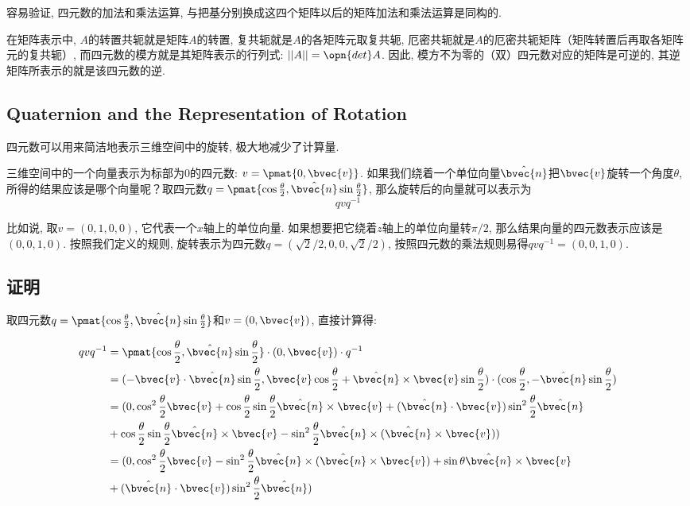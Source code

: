 容易验证, 四元数的加法和乘法运算, 与把基分别换成这四个矩阵以后的矩阵加法和乘法运算是同构的. 

在矩阵表示中, $A$的转置共轭就是矩阵$A$的转置, 复共轭就是$A$的各矩阵元取复共轭, 厄密共轭就是$A$的厄密共轭矩阵（矩阵转置后再取各矩阵元的复共轭）, 而四元数的模方就是其矩阵表示的行列式: $||A||=\opn{det}A$. 因此, 模方不为零的（双）四元数对应的矩阵是可逆的, 其逆矩阵所表示的就是该四元数的逆. 



\subsection{Quaternion and the Representation of Rotation}

四元数可以用来简洁地表示三维空间中的旋转, 极大地减少了计算量. 

三维空间中的一个向量表示为标部为$0$的四元数: $v=\pmat{0, \bvec{v}}$. 如果我们绕着一个单位向量$\hat{\bvec{n}}$把$\bvec{v}$旋转一个角度$\theta$, 所得的结果应该是哪个向量呢？取四元数$q=\pmat{\cos{\frac{\theta}{2}}, \hat{\bvec{n}}\sin{\frac{\theta}{2}}}$, 那么旋转后的向量就可以表示为
\begin{equation}
qvq^{-1}
\end{equation}

比如说, 取$v=(0, 1, 0, 0)$, 它代表一个$x$轴上的单位向量. 如果想要把它绕着$z$轴上的单位向量转$\pi/2$, 那么结果向量的四元数表示应该是$(0, 0, 1, 0)$. 按照我们定义的规则, 旋转表示为四元数$q=(\sqrt{2}/2, 0, 0, \sqrt{2}/2)$, 按照四元数的乘法规则易得$qvq^{-1}=(0,0,1,0)$. 

\subsection{证明}

取四元数$q=\pmat{\cos{\frac{\theta}{2}}, \hat{\bvec{n}}\sin{\frac{\theta}{2}}}$和$v=(0, \bvec{v})$, 直接计算得: 

\begin{equation}
\begin{aligned}
qvq^{-1}&=\pmat{\cos{\frac{\theta}{2}}, \hat{\bvec{n}}\sin{\frac{\theta}{2}}}\cdot (0, \bvec{v})\cdot q^{-1}\\&
=(-\bvec{v}\cdot\hat{\bvec{n}}\sin{\frac{\theta}{2}}, \bvec{v}\cos{\frac{\theta}{2}}+\hat{\bvec{n}}\times\bvec{v}\sin{\frac{\theta}{2}})\cdot (\cos{\frac{\theta}{2}}, -\hat{\bvec{n}}\sin{\frac{\theta}{2}})\\&
=(0, \cos^2\frac{\theta}{2}\bvec{v}+\cos\frac{\theta}{2}\sin\frac{\theta}{2}\hat{\bvec{n}}\times\bvec{v}+(\hat{\bvec{n}}\cdot\bvec{v})\sin^2\frac{\theta}{2}\hat{\bvec{n}}\\&+\cos\frac{\theta}{2}\sin\frac{\theta}{2}\hat{\bvec{n}}\times\bvec{v}-\sin^2\frac{\theta}{2}\hat{\bvec{n}}\times(\hat{\bvec{n}}\times\bvec{v}))\\&
=(0, \cos^2\frac{\theta}{2}\bvec{v}-\sin^2\frac{\theta}{2}\hat{\bvec{n}}\times(\hat{\bvec{n}}\times\bvec{v})+\sin\theta\hat{\bvec{n}}\times\bvec{v}\\&+(\hat{\bvec{n}}\cdot\bvec{v})\sin^2\frac{\theta}{2}\hat{\bvec{n}})
\end{aligned}
\end{equation}


